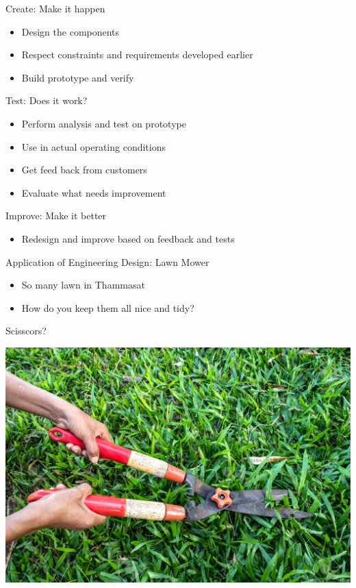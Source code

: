 \documentclass[10pt, svgnames]{beamer}
\begin{document}
\begin{frame}[label={sec:org0af7674}]{Create: Make it happen}
\begin{itemize}
\item Design the components
\item Respect constraints and requirements developed earlier
\item Build prototype and verify
\end{itemize}
\end{frame}


\begin{frame}[label={sec:orgae05472}]{Test: Does it work?}
\begin{itemize}
\item Perform analysis and test on prototype
\item Use in actual operating conditions
\item Get feed back from customers
\item Evaluate what needs improvement
\end{itemize}
\end{frame}


\begin{frame}[label={sec:org9c1441b}]{Improve: Make it better}
\begin{itemize}
\item Redesign and improve based on feedback and tests
\end{itemize}
\end{frame}


\begin{frame}[label={sec:org68343ad}]{Application of Engineering Design: Lawn Mower}
\begin{itemize}
\item So many lawn in Thammasat
\item How do you keep them all nice and tidy?
\end{itemize}
\end{frame}


\begin{frame}[label={sec:orgef20b7f}]{Scisscors?}
\begin{center}
  \includegraphics[width=.9\linewidth]{./pictures/grass-shears.jpg}
\end{center}
\end{frame}
\end{document}
